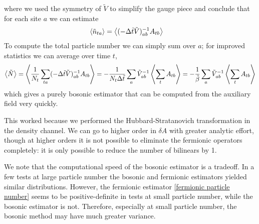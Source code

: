 where we used the symmetry of $\tilde{V}$ to simplify the gauge piece and conclude that for each site $a$ we can estimate
\begin{align}
	\left\langle \tilde{n}_{ta} \right\rangle &= \left\langle (-\Delta\tilde{t}\tilde{V})_{ab}^{-1} A_{tb} \right\rangle
\end{align}
To compute the total particle number we can simply sum over $a$; for improved statistics we can average over time $t$,
\begin{align}
	\left\langle \tilde{N} \right\rangle
	= \left\langle \frac{1}{N_t}\sum_{ta}(-\Delta\tilde{t}\tilde{V})_{ab}^{-1} A_{tb} \right\rangle
    = - \frac{1}{N_t \Delta \tilde{t}} \sum_a \tilde{V}_{ab}^{-1} \left\langle  \sum_t A_{tb} \right\rangle
    = - \frac{1}{\tilde{\beta}} \sum_a \tilde{V}_{ab}^{-1} \left\langle  \sum_t A_{tb} \right\rangle
	\label{eq:bosonic particle number}
\end{align}
which gives a purely bosonic estimator that can be computed from the auxiliary field very quickly.

This worked because we performed the Hubbard-Stratanovich transformation in the density channel.
We can go to higher order in $\delta A$ with greater analytic effort, though at higher orders it is not possible to eliminate the fermionic operators completely: it is only possible to reduce the number of bilinears by 1.

We note that the computational speed of the bosonic estimator is a tradeoff.
In a few tests at large particle number the bosonic and fermionic estimators yielded similar distributions.
However, the fermionic estimator \eqref{fermionic particle number} seems to be positive-definite in tests at small particle number, while the bosonic estimator is not.
Therefore, especially at small particle number, the bosonic method may have much greater variance.



